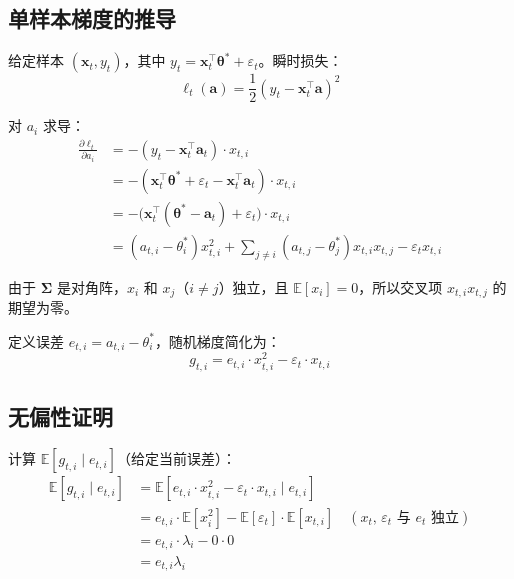 \documentclass[12pt, a4paper]{ctexart}
\begin{document}
\subsection{单样本梯度的推导}

给定样本 $(\mathbf{x}_t, y_t)$，其中 $y_t = \mathbf{x}_t^\top \boldsymbol{\theta}^* + \varepsilon_t$。瞬时损失：
\begin{equation}
    \ell_t(\mathbf{a}) = \frac{1}{2}(y_t - \mathbf{x}_t^\top \mathbf{a})^2
\end{equation}

对 $a_i$ 求导：
\begin{align}
    \frac{\partial \ell_t}{\partial a_i} &= -(y_t - \mathbf{x}_t^\top \mathbf{a}_t) \cdot x_{t,i} \\
    &= -(\mathbf{x}_t^\top \boldsymbol{\theta}^* + \varepsilon_t - \mathbf{x}_t^\top \mathbf{a}_t) \cdot x_{t,i} \\
    &= -\bigl(\mathbf{x}_t^\top (\boldsymbol{\theta}^* - \mathbf{a}_t) + \varepsilon_t\bigr) \cdot x_{t,i} \\
    &= (a_{t,i} - \theta_i^*) x_{t,i}^2 + \sum_{j \neq i} (a_{t,j} - \theta_j^*) x_{t,i} x_{t,j} - \varepsilon_t x_{t,i}
\end{align}

由于 $\boldsymbol{\Sigma}$ 是对角阵，$x_i$ 和 $x_j$（$i \neq j$）独立，且 $\mathbb{E}[x_i] = 0$，所以交叉项 $x_{t,i}x_{t,j}$ 的期望为零。

定义误差 $e_{t,i} = a_{t,i} - \theta_i^*$，随机梯度简化为：
\begin{equation}
    g_{t,i} = e_{t,i} \cdot x_{t,i}^2 - \varepsilon_t \cdot x_{t,i}
\end{equation}

\subsection{无偏性证明}

计算 $\mathbb{E}[g_{t,i} \mid e_{t,i}]$（给定当前误差）：
\begin{align}
    \mathbb{E}[g_{t,i} \mid e_{t,i}] &= \mathbb{E}[e_{t,i} \cdot x_{t,i}^2 - \varepsilon_t \cdot x_{t,i} \mid e_{t,i}] \\
    &= e_{t,i} \cdot \mathbb{E}[x_i^2] - \mathbb{E}[\varepsilon_t] \cdot \mathbb{E}[x_{t,i}] \quad (\text{$x_t$, $\varepsilon_t$ 与 $e_t$ 独立})\\
    &= e_{t,i} \cdot \lambda_i - 0 \cdot 0 \\
    &= e_{t,i} \lambda_i
\end{align}
\end{document}
